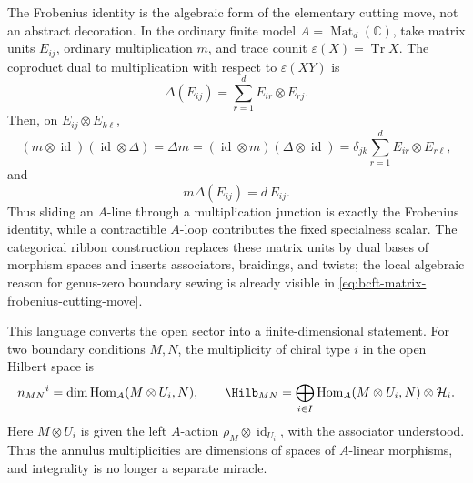 The Frobenius identity is the algebraic form of the elementary cutting move,
not an abstract decoration.  In the ordinary finite model
\(A=\operatorname{Mat}_d(\mathbb C)\), take matrix units \(E_{ij}\), ordinary
multiplication \(m\), and trace counit \(\varepsilon(X)=\operatorname{Tr}X\).
The coproduct dual to multiplication with respect to
\(\varepsilon(XY)\) is
\begin{equation}
  \Delta(E_{ij})
  =
  \sum_{r=1}^{d} E_{ir}\otimes E_{rj}.
  \label{eq:bcft-matrix-frobenius-coproduct}
\end{equation}
Then, on \(E_{ij}\otimes E_{k\ell}\),
\begin{equation}
  (m\otimes\operatorname{id})
  (\operatorname{id}\otimes\Delta)
  =
  \Delta m
  =
  (\operatorname{id}\otimes m)
  (\Delta\otimes\operatorname{id})
  =
  \delta_{jk}\sum_{r=1}^{d} E_{ir}\otimes E_{r\ell},
  \label{eq:bcft-matrix-frobenius-cutting-move}
\end{equation}
and
\begin{equation}
  m\Delta(E_{ij})=d\,E_{ij}.
  \label{eq:bcft-matrix-frobenius-specialness}
\end{equation}
Thus sliding an \(A\)-line through a multiplication junction is exactly the
Frobenius identity, while a contractible \(A\)-loop contributes the fixed
specialness scalar.  The categorical ribbon construction replaces these
matrix units by dual bases of morphism spaces and inserts associators,
braidings, and twists; the local algebraic reason for genus-zero boundary
sewing is already visible in \eqref{eq:bcft-matrix-frobenius-cutting-move}.

This language converts the open sector into a finite-dimensional statement.
For two boundary conditions \(M,N\), the multiplicity of chiral type \(i\)
in the open Hilbert space is
\begin{equation}
  n_{MN}{}^i
  =
  \dim
  \operatorname{Hom}_{A}(M\otimes U_i,N),
  \qquad
  \Hilb_{MN}
  =
  \bigoplus_{i\in I}
  \operatorname{Hom}_{A}(M\otimes U_i,N)\otimes\mathcal H_i .
  \label{eq:bcft-module-open-sector}
\end{equation}
Here \(M\otimes U_i\) is given the left \(A\)-action
\(\rho_M\otimes\operatorname{id}_{U_i}\), with the associator understood.
Thus the annulus multiplicities are dimensions of spaces of \(A\)-linear
morphisms, and integrality is no longer a separate miracle.


